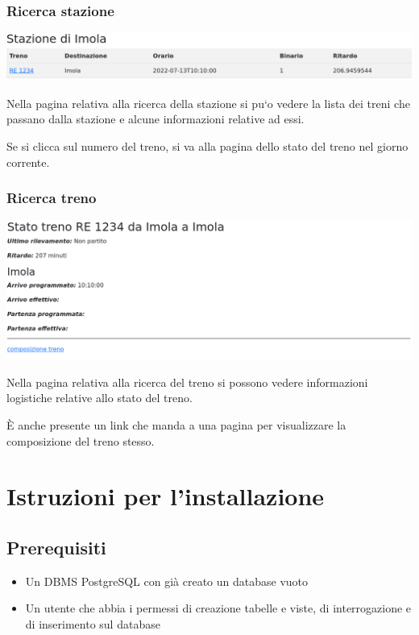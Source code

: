 \documentclass[a4paper,12pt]{report}
\begin{document}
	\subsection{Ricerca stazione}
	\includegraphics[width=\linewidth]{res/screenshots/stazione.png}
	\par Nella pagina relativa alla ricerca della stazione si pu`o vedere la lista dei treni che passano dalla stazione e alcune informazioni relative ad essi.
	\par Se si clicca sul numero del treno, si va alla pagina dello stato del treno nel giorno corrente.
	\subsection{Ricerca treno}
	\includegraphics[width=\linewidth]{res/screenshots/stato_treno.png}
	\par Nella pagina relativa alla ricerca del treno si possono vedere informazioni logistiche relative allo stato del treno.
	\par \`E anche presente un link che manda a una pagina per visualizzare la composizione del treno stesso.
	\appendix
	\chapter{Istruzioni per l'installazione}
	\section{Prerequisiti}
	\begin{itemize}
		\item Un DBMS PostgreSQL con già creato un database vuoto
		\item Un utente che abbia i permessi di creazione tabelle e viste, di interrogazione e di inserimento sul database
	\end{itemize}
\end{document}
